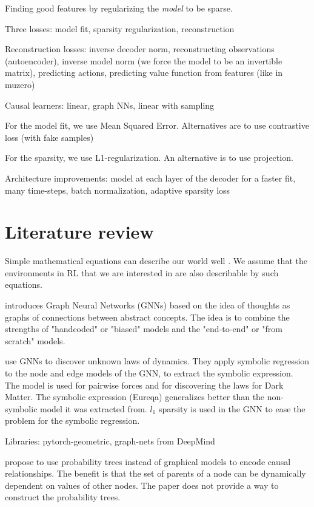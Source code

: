 \documentclass{article}
\begin{document}
Finding good features by regularizing the {\em model} to be sparse.

Three losses: model fit, sparsity regularization, reconstruction

Reconstruction losses: inverse decoder norm, reconstructing observations (autoencoder), inverse model norm (we force the model to be an invertible matrix), predicting actions, predicting value function from features (like in muzero)

Causal learners: linear, graph NNs, linear with sampling

For the model fit, we use Mean Squared Error. Alternatives are to use contrastive loss (with fake samples)

For the sparsity, we use L1-regularization. An alternative is to use projection.

Architecture improvements: model at each layer of the decoder for a faster fit, many time-steps, batch normalization, adaptive sparsity loss

\section{Literature review}

Simple mathematical equations can describe our world well \cite{hamming1980unreasonable}. We assume that the environments in RL that we are interested in are also describable by such equations.

\cite{Battaglia2018} introduces Graph Neural Networks (GNNs) based on the idea of thoughts as graphs of connections between abstract concepts. The idea is to combine the strengths of "handcoded" or "biased" models and the "end-to-end" or "from scratch" models.

\cite{Cranmer2020} use GNNs to discover unknown laws of dynamics. They apply symbolic regression to the node and edge models of the GNN, to extract the symbolic expression. The model is used for pairwise forces and for discovering the laws for Dark Matter. The symbolic expression (Eureqa) generalizes better than the non-symbolic model it was extracted from. $l_1$ sparsity is used in the GNN to ease the problem for the symbolic regression.

Libraries: pytorch-geometric, graph-nets from DeepMind

\cite{Genewein} propose to use probability trees instead of graphical models to encode causal relationships. The benefit is that the set of parents of a node can be dynamically dependent on values of other nodes. The paper does not provide a way to construct the probability trees. 
\end{document}
